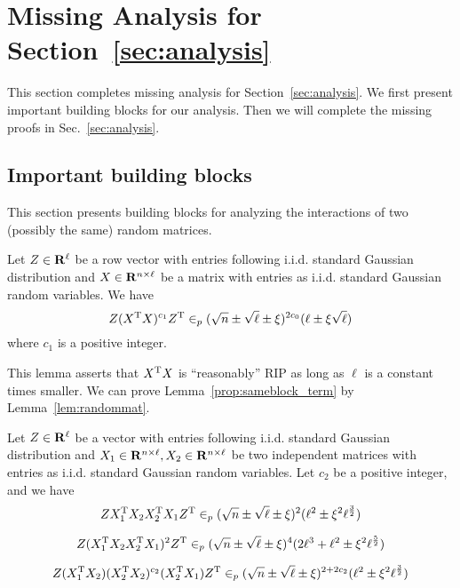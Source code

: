 \section{Missing Analysis for Section~\ref{sec:analysis}}
This section completes missing analysis for Section~\ref{sec:analysis}. We first present important building blocks for our analysis. Then we will complete the missing proofs in Sec.~\ref{sec:analysis}. 

\subsection{Important building blocks}
This section presents building blocks for analyzing the interactions of two (possibly the same) random matrices. 

\begin{lemma}\label{prop:sameblock_term}
Let $Z \in \mathbf{R}^{\ell}$ be a row vector with entries following i.i.d. standard Gaussian distribution and $X \in \mathbf{R}^{n\times \ell}$ be a matrix with entries as i.i.d. standard Gaussian random variables. We have
\begin{equation}
    Z(X^{\mathrm{T}}X)^{c_1}Z^{\mathrm{T}} 
    \in_p (\sqrt n \pm \sqrt \ell \pm \xi)^{2c_0}(\ell \pm \xi \sqrt{\ell})
\end{equation}
where $c_1$ is a positive integer.
\end{lemma}

This lemma asserts that $X^{\mathrm{T}}X$ is ``reasonably'' RIP as long as $\ell$ is a constant times smaller. We can prove Lemma~\ref{prop:sameblock_term} by Lemma~\ref{lem:randommat}. 

 

\begin{lemma} \label{prop:difblock_term}
Let $Z \in \mathbf{R}^{\ell}$ be a vector with entries following i.i.d. standard Gaussian distribution and $X_1 \in \mathbf{R}^{n\times \ell}, X_2 \in \mathbf{R}^{n\times \ell}$ be two independent matrices with entries as i.i.d. standard Gaussian random variables.  Let $c_2$ be a positive integer, and we have
\begin{equation}
    Z X_1^{\mathrm{T}}X_2X_2^{\mathrm{T}}X_1 Z^{\mathrm{T}}
    \in_p (\sqrt n \pm \sqrt \ell \pm \xi)^{2}(\ell^{2} \pm \xi^2 \ell^{\frac{3}{2}})
\end{equation}

\begin{equation}
    Z(X_1^{\mathrm{T}}X_2X_2^{\mathrm{T}}X_1)^{2} Z^{\mathrm{T}}
    \in_p (\sqrt n \pm \sqrt \ell \pm \xi)^{4}(2\ell^3 + \ell^2 \pm \xi^2 \ell^{\frac{5}{2}})
\end{equation}

\begin{equation}
    Z(X_1^{\mathrm{T}}X_2)(X_2^{\mathrm{T}}X_2)^{c_2}(X_2^{\mathrm{T}}X_1) Z^{\mathrm{T}}
    \in_p (\sqrt n \pm \sqrt \ell \pm \xi)^{2+2c_2}(\ell^{2} \pm \xi^2 \ell^{\frac{3}{2}})
\end{equation}
\end{lemma}

